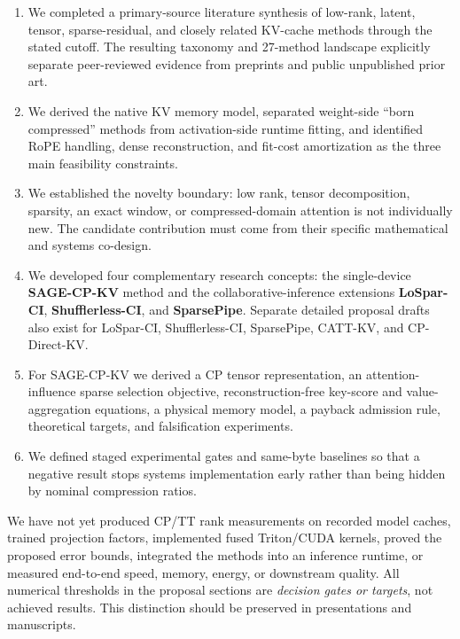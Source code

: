 \documentclass[10pt]{article}
\begin{document}
\begin{donebox}[title={Work completed to date}]
\begin{enumerate}[leftmargin=1.55em,itemsep=3pt,topsep=2pt]
\item We completed a primary-source literature synthesis of low-rank, latent, tensor,
sparse-residual, and closely related KV-cache methods through the stated cutoff. The resulting
taxonomy and 27-method landscape explicitly separate peer-reviewed evidence from preprints and
public unpublished prior art.
\item We derived the native KV memory model, separated weight-side ``born compressed'' methods
from activation-side runtime fitting, and identified RoPE handling, dense reconstruction, and
fit-cost amortization as the three main feasibility constraints.
\item We established the novelty boundary: low rank, tensor decomposition, sparsity, an exact
window, or compressed-domain attention is not individually new. The candidate contribution must
come from their specific mathematical and systems co-design.
\item We developed four complementary research concepts: the single-device
\textbf{SAGE-CP-KV} method and the collaborative-inference extensions
\textbf{LoSpar-CI}, \textbf{Shufflerless-CI}, and \textbf{SparsePipe}. Separate detailed
proposal drafts also exist for LoSpar-CI, Shufflerless-CI, SparsePipe, CATT-KV, and CP-Direct-KV.
\item For SAGE-CP-KV we derived a CP tensor representation, an attention-influence sparse
selection objective, reconstruction-free key-score and value-aggregation equations, a physical
memory model, a payback admission rule, theoretical targets, and falsification experiments.
\item We defined staged experimental gates and same-byte baselines so that a negative result
stops systems implementation early rather than being hidden by nominal compression ratios.
\end{enumerate}
\end{donebox}

\begin{statusbox}[title={Work not yet completed---and therefore not claimed as a result}]
We have not yet produced CP/TT rank measurements on recorded model caches, trained projection
factors, implemented fused Triton/CUDA kernels, proved the proposed error bounds, integrated the
methods into an inference runtime, or measured end-to-end speed, memory, energy, or downstream
quality. All numerical thresholds in the proposal sections are \emph{decision gates or targets},
not achieved results. This distinction should be preserved in presentations and manuscripts.
\end{statusbox}
\end{document}
